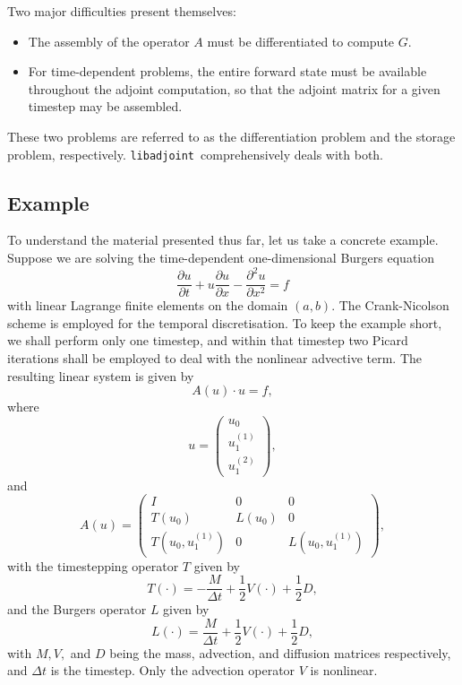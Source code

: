\documentclass[10pt,authoryear]{elsarticle}
\newcommand{\libadjoint}[0]{{\texttt{libadjoint}}}
\begin{document}
Two major difficulties present themselves:
\begin{itemize}
\item The assembly of the operator $A$ must be differentiated to compute $G$.
\item For time-dependent problems, the entire forward state must be available throughout the adjoint computation,
so that the adjoint matrix for a given timestep may be assembled.
\end{itemize}

These two problems are referred to as the differentiation problem and the storage problem, respectively.
\libadjoint\ comprehensively deals with both.

\subsection{Example} \label{sec:example}
To understand the material presented thus far,
let us take a concrete example. Suppose we are solving the time-dependent one-dimensional Burgers equation
\begin{equation}
\frac{\partial u}{\partial t} + u \frac{\partial u}{\partial x} - \frac{\partial^2 u}{\partial x^2} = f
\end{equation}
with linear Lagrange finite elements on the domain $(a, b)$. The Crank-Nicolson scheme is employed for
the temporal discretisation. To keep the example short, we shall perform only one timestep,
and within that timestep two Picard iterations shall be employed to deal with the nonlinear advective
term. The resulting linear system is given by
\begin{equation}
A(u)\cdot u = f,
\end{equation}
where
\begin{equation}
u = \begin{pmatrix}
u_0 \\
u_1^{(1)} \\
u_1^{(2)} \end{pmatrix},
\end{equation}
and
\begin{equation}
A(u) = \begin{pmatrix}
I & 0 & 0 \\
T(u_0) & L(u_0) & 0 \\
T(u_0, u_1^{(1)}) & 0 & L(u_0, u_1^{(1)}) \end{pmatrix},
\end{equation}
with the timestepping operator $T$ given by
\begin{equation}
T(\cdot) = -\frac{M}{\Delta t} + \frac{1}{2}V(\cdot) + \frac{1}{2}D,
\end{equation}
and the Burgers operator $L$ given by
\begin{equation}
L(\cdot) = \frac{M}{\Delta t} + \frac{1}{2}V(\cdot) + \frac{1}{2}D,
\end{equation}
with $M, V,$ and $D$ being the mass, advection, and diffusion matrices respectively, and $\Delta t$ is the timestep.
Only the advection operator $V$ is nonlinear.
\end{document}
